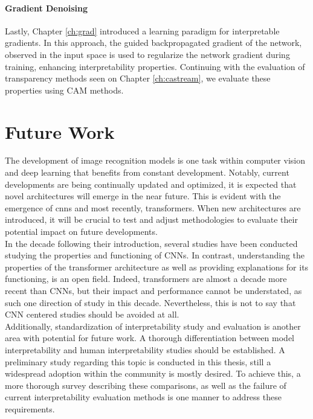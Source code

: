 \paragraph{Gradient Denoising}
\label{sub:conc_grad}
\noindent Lastly, Chapter \ref{ch:grad} introduced a learning paradigm for interpretable gradients. 
In this approach, the guided backpropagated gradient of the network, observed in the input space is 
used to regularize the network gradient during training, enhancing interpretability properties. 
Continuing with the evaluation of transparency methods seen on Chapter \ref{ch:castream}, we 
evaluate these properties using CAM methods.\\

\section{Future Work}
\label{sec:conc_futur}
The development of image recognition models is one task within computer vision and deep learning 
that benefits from constant development. Notably, current developments are being continually 
updated and optimized, it is expected  that novel architectures will emerge in the near future. 
This is evident with the emergence of \glspl{cnn} and most recently, transformers. When new 
architectures are introduced, it will be crucial to test and adjust methodologies to evaluate 
their potential impact on future developments. \\

\noindent In the decade following their introduction, several studies have been 
conducted studying the properties and functioning of CNNs. In contrast, understanding the properties 
of the transformer architecture as well as providing explanations for its functioning, is an open 
field. Indeed, transformers are almost a decade more recent than CNNs, but their impact and 
performance cannot be understated, as such one direction of study in this decade. Nevertheless, 
this is not to say that CNN centered studies should be avoided at all.\\

\noindent Additionally, standardization of interpretability study and evaluation is another area 
with potential for future work. A thorough differentiation between model 
interpretability and human interpretability studies should be established. A preliminary study 
regarding this topic is conducted in this thesis, still a widespread adoption within the 
community is mostly desired. To achieve this, a more thorough survey describing these comparisons, 
as well as the failure of current interpretability evaluation methods is one manner to address 
these requirements.\\

